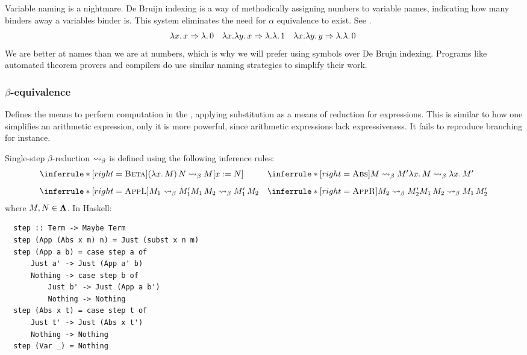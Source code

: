 \begin{note}
  Variable naming is a nightmare. De Bruijn indexing is a way of methodically assigning numbers to variable names, indicating how many binders away a variables binder is. This system eliminates the need for $\alpha$ equivalence to exist. See \cite{deBruijn1972}.
  \[
    \lambda x.\, x \Rightarrow \lambda.\, 0 \quad \lambda x. \lambda y.\, x \Rightarrow \lambda. \lambda.\, 1 \quad \lambda x. \lambda y.\, y \Rightarrow \lambda. \lambda. \, 0\,
  \]
  We are better at names than we are at numbers, which is why we will prefer using symbols over De Brujn indexing. Programs like automated theorem provers and compilers do use similar naming strategies to simplify their work.
\end{note}
\subsubsection{\centering $\beta$-equivalence}
Defines the means to perform computation in the \lcalc, applying substitution as a means of reduction for expressions. This is similar to how one simplifies an arithmetic expression, only it is more powerful, since arithmetic expressions lack expressiveness. It fails to reproduce branching for instance.
\begin{definition} Single-step $\beta$-reduction $\mathrel{\leadsto}_\beta$ is defined using the following inference rules:
  \[
    \begin{array}{@{}l@{\quad}l@{}}
      \inferrule*[right=\textsc{Beta}]
      { }
      { (\lam{x}{M})\,N \step M\subst{x}{N} }
      &
        \inferrule*[right=\textsc{Abs}]
        { M \step M' }
        { \lam{x}{M} \step \lam{x}{M'} } \\[2ex]
      \inferrule*[right=\textsc{AppL}]
      { M_1 \step M_1' }
      { M_1\,M_2 \step M_1'\,M_2 }
      &
        \inferrule*[right=\textsc{AppR}]
        { M_2 \step M_2' }
        { M_1\,M_2 \step M_1\,M_2' }
    \end{array}
  \]
  where \( M, N \in \mathbf{\Lambda} \). In Haskell:
  \begin{verbatim}
  step :: Term -> Maybe Term
  step (App (Abs x m) n) = Just (subst x n m)
  step (App a b) = case step a of
      Just a' -> Just (App a' b)
      Nothing -> case step b of
          Just b' -> Just (App a b')
          Nothing -> Nothing
  step (Abs x t) = case step t of
      Just t' -> Just (Abs x t')
      Nothing -> Nothing
  step (Var _) = Nothing
  \end{verbatim}
\end{definition} 
